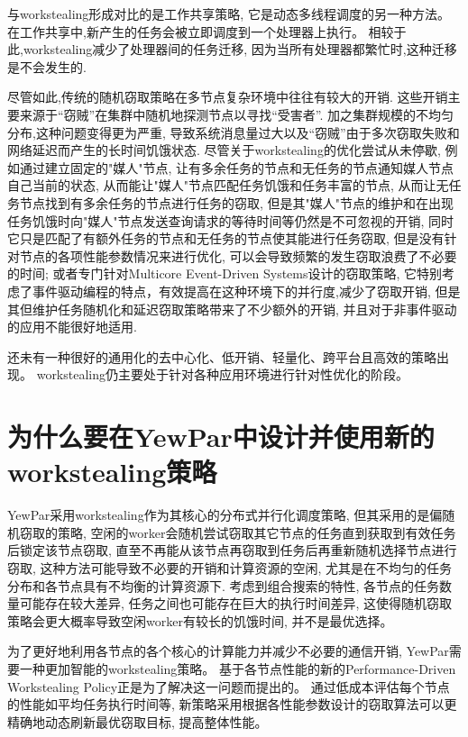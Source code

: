 \documentclass{mproj}
\begin{document}
与workstealing形成对比的是工作共享策略,
它是动态多线程调度的另一种方法。
在工作共享中,新产生的任务会被立即调度到一个处理器上执行。
相较于此,workstealing减少了处理器间的任务迁移,
因为当所有处理器都繁忙时,这种迁移是不会发生的.\cite{10.1145/324133.324234}

尽管如此,传统的随机窃取策略在多节点复杂环境中往往有较大的开销.
这些开销主要来源于“窃贼”在集群中随机地探测节点以寻找“受害者”.
加之集群规模的不均匀分布,这种问题变得更为严重,
导致系统消息量过大以及“窃贼”由于多次窃取失败和网络延迟而产生的长时间饥饿状态.
尽管关于workstealing的优化尝试从未停歇,
例如通过建立固定的"媒人"节点,
让有多余任务的节点和无任务的节点通知媒人节点自己当前的状态,
从而能让"媒人"节点匹配任务饥饿和任务丰富的节点,
从而让无任务节点找到有多余任务的节点进行任务的窃取\cite{10.1145/2851141.2851175},
但是其"媒人"节点的维护和在出现任务饥饿时向"媒人"节点发送查询请求的等待时间等仍然是不可忽视的开销,
同时它只是匹配了有额外任务的节点和无任务的节点使其能进行任务窃取,
但是没有针对节点的各项性能参数情况来进行优化,
可以会导致频繁的发生窃取浪费了不必要的时间;
或者专门针对Multicore Event-Driven Systems设计的窃取策略\cite{5541655},
它特别考虑了事件驱动编程的特点，有效提高在这种环境下的并行度,减少了窃取开销,
但是其但维护任务随机化和延迟窃取策略带来了不少额外的开销,
并且对于非事件驱动的应用不能很好地适用.

还未有一种很好的通用化的去中心化、低开销、轻量化、跨平台且高效的策略出现。
workstealing仍主要处于针对各种应用环境进行针对性优化的阶段。

\section{为什么要在YewPar中设计并使用新的workstealing策略}

YewPar采用workstealing作为其核心的分布式并行化调度策略,
但其采用的是偏随机窃取的策略\cite{archibald2019yewpar},
空闲的worker会随机尝试窃取其它节点的任务直到获取到有效任务后锁定该节点窃取,
直至不再能从该节点再窃取到任务后再重新随机选择节点进行窃取,
这种方法可能导致不必要的开销和计算资源的空闲,
尤其是在不均匀的任务分布和各节点具有不均衡的计算资源下.
考虑到组合搜索的特性,
各节点的任务数量可能存在较大差异,
任务之间也可能存在巨大的执行时间差异,
这使得随机窃取策略会更大概率导致空闲worker有较长的饥饿时间,
并不是最优选择。

为了更好地利用各节点的各个核心的计算能力并减少不必要的通信开销,
YewPar需要一种更加智能的workstealing策略。
基于各节点性能的新的Performance-Driven Workstealing Policy正是为了解决这一问题而提出的。
通过低成本评估每个节点的性能如平均任务执行时间等,
新策略采用根据各性能参数设计的窃取算法可以更精确地动态刷新最优窃取目标,
提高整体性能。
\end{document}
